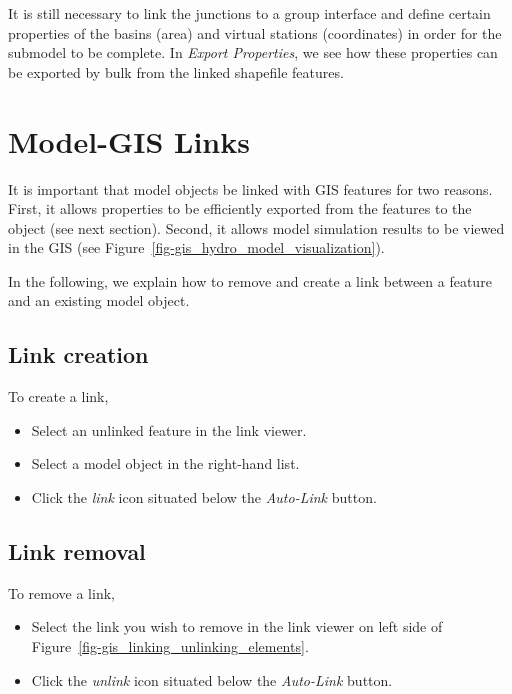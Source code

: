 \documentclass[
  letterpaper,
  DIV=11,
  numbers=noendperiod]{scrreprt}
\begin{document}
It is still necessary to link the junctions to a group interface and
define certain properties of the basins (area) and virtual stations
(coordinates) in order for the submodel to be complete. In \emph{Export
Properties}, we see how these properties can be exported by bulk from
the linked shapefile features.

\hypertarget{model-gis-links}{%
\section{Model-GIS Links}\label{model-gis-links}}

It is important that model objects be linked with GIS features for two
reasons. First, it allows properties to be efficiently exported from the
features to the object (see next section). Second, it allows model
simulation results to be viewed in the GIS (see
Figure~\ref{fig-gis_hydro_model_visualization}).

In the following, we explain how to remove and create a link between a
feature and an existing model object.

\hypertarget{link-creation}{%
\subsection{Link creation}\label{link-creation}}

To create a link,

\begin{itemize}
\item
  {Select an unlinked feature in the link viewer.}
\item
  {Select a model object in the right-hand list.}
\item
  {Click the \emph{link} icon situated below the \emph{Auto-Link}
  button.}
\end{itemize}

\hypertarget{link-removal}{%
\subsection{Link removal}\label{link-removal}}

To remove a link,

\begin{itemize}
\item
  {Select the link you wish to remove in the link viewer on left side of
  Figure~\ref{fig-gis_linking_unlinking_elements}.}
\item
  {Click the \emph{unlink} icon situated below the \emph{Auto-Link}
  button.}
\end{itemize}
\end{document}

